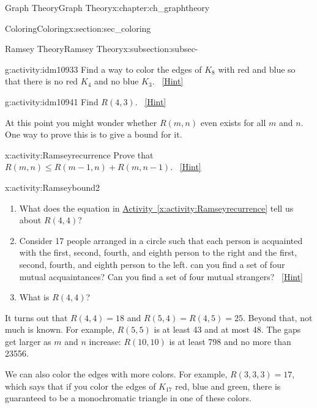 \documentclass[oneside,10pt,]{book}
\numberwithin{equation}{chapter}
\begin{document}
\begin{chapterptx}{Graph Theory}{}{Graph Theory}{}{}{x:chapter:ch_graphtheory}
\begin{sectionptx}{Coloring}{}{Coloring}{}{}{x:section:sec_coloring}
\begin{subsectionptx}{Ramsey Theory}{}{Ramsey Theory}{}{}{x:subsection:subsec-}
\begin{activity}{}{g:activity:idm10933}
Find a way to color the edges of \(K_8\) with red and blue so that there is no red \(K_4\) and no blue \(K_3\).%
\qquad~\hfill{\tiny\hyperlink{g:hint:idm10939-back}{[Hint]}}\end{activity}
\begin{activity}{}{g:activity:idm10941}%
Find \(R(4,3)\).%
\qquad~\hfill{\tiny\hyperlink{g:hint:idm10945-back}{[Hint]}}\end{activity}
At this point you might wonder whether \(R(m,n)\) even exists for all \(m\) and \(n\).  One way to prove this is to give a bound for it.%
\begin{activity}{}{x:activity:Ramseyrecurrence}%
Prove that \(R(m,n)\le R(m-1,n) + R(m,n-1)\).%
\qquad~\hfill{\tiny\hyperlink{g:hint:idm10960-back}{[Hint]}}\end{activity}
\begin{activity}{}{x:activity:Ramseybound2}%
\begin{enumerate}[font=\bfseries,label=(\alph*),ref=\alph*]
\item{}What does the equation in \hyperref[x:activity:Ramseyrecurrence]{Activity~\ref{x:activity:Ramseyrecurrence}} tell us about \(R(4,4)\)?%
\item{}Consider 17 people arranged in a circle such that each person is acquainted with the first, second, fourth, and eighth person to the right and the first, second, fourth, and eighth person to the left.  can you find a set of four mutual acquaintances?  Can you find a set of four mutual strangers?%
\qquad~\hfill{\tiny\hyperlink{g:hint:idm11004-back}{[Hint]}}\item{}What is \(R(4,4)\)?%
\end{enumerate}
\end{activity}
It turns out that \(R(4,4) = 18\) and \(R(5, 4) = R(4,5) = 25\).  Beyond that, not much is known.  For example, \(R(5,5)\) is at least 43 and at most 48.  The gaps get larger as \(m\) and \(n\) increase: \(R(10,10)\) is at least 798 and no more than 23556.%
\par
We can also color the edges with more colors.  For example, \(R(3,3,3) = 17\), which says that if you color the edges of \(K_{17}\) red, blue and green, there is guaranteed to be a monochromatic triangle in one of these colors.%
\end{subsectionptx}
\end{sectionptx}
%
%
\typeout{************************************************}
\typeout{************************************************}

\end{chapterptx}
\end{document}
